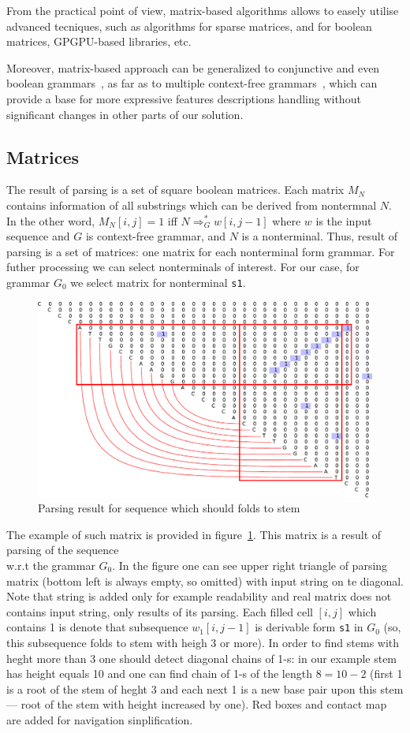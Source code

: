 \documentclass[a4paper,twoside]{article}
\begin{document}
From the practical point of view, matrix-based algorithms allows to easely utilise advanced tecniques, such as algorithms for sparse matrices, and for boolean matrices, GPGPU-based libraries, etc.

Moreover, matrix-based approach can be generalized to conjunctive and even boolean grammars~\cite{OKHOTIN2014101}, as far as to multiple context-free grammars~\cite{mcfgMatrices}, which can provide a base for more expressive features descriptions handling without significant changes in other parts of our solution.

\subsection{Matrices}

\noindent The result of parsing is a set of square boolean matrices. 
Each matrix $M_N$ contains information of all substrings which can be derived from nontermnal $N$.
In the other word, $M_N[i,j]=1$ iff $N \Rightarrow^*_G w[i,j-1]$ where $w$ is the input sequence and $G$ is context-free grammar, and $N$ is a nonterminal.
Thus, result of parsing is a set of matrices: one matrix for each nonterminal form grammar.
For futher processing we can select nonterminals of interest.
For our case, for grammar $G_0$ we select matrix for nonterminal \verb|s1|.

\begin{figure}
\centering
\includegraphics[width=.45\textwidth]{figures/4.pdf}
\caption{Parsing result for sequence which should folds to stem}
\label{fig:matrix-simple-stem}
\end{figure}

The example of such matrix is provided in figure~\ref{fig:matrix-simple-stem}.
This matrix is a result of parsing of the sequence {  \\} w.r.t the grammar $G_0$.
In the figure one can see upper right triangle of parsing matrix (bottom left is always empty, so omitted) with input string on te diagonal.
Note that string is added only for example readability and real matrix does not contains input string, only results of its parsing.
Each filled cell $[i,j]$ which contains 1 is denote that subsequence $w_1[i,j-1]$ is derivable form \verb|s1| in $G_0$ (so, this subsequence folds to stem with heigh 3 or more).
In order to find stems with heght more than 3 one should detect diagonal chains of 1-s: in our example stem has height equals 10 and one can find chain of 1-s of the length $8=10-2$ (first 1 is a root of the stem of heght 3 and each next 1 is a new base pair upon this stem --- root of the stem with height increased by one).
Red boxes and contact map are added for navigation sinplification.
\end{document}
